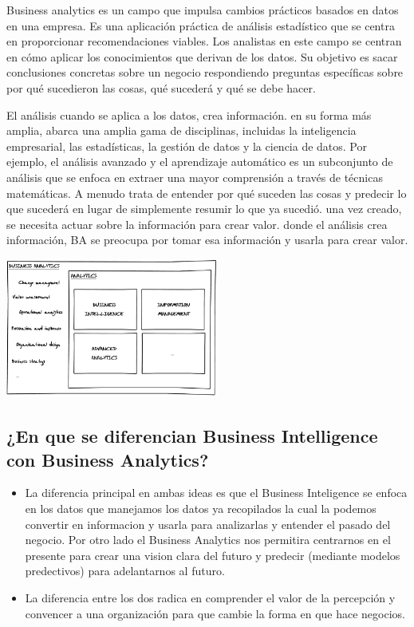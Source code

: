 \documentclass[twoside,twocolumn]{article}
\begin{document}
Business analytics es un campo que impulsa cambios prácticos basados en datos en una empresa. Es una aplicación práctica de análisis estadístico que se centra en proporcionar recomendaciones viables. Los analistas en este campo se centran en cómo aplicar los conocimientos que derivan de los datos. Su objetivo es sacar conclusiones concretas sobre un negocio respondiendo preguntas específicas sobre por qué sucedieron las cosas, qué sucederá y qué se debe hacer.
 
El análisis cuando se aplica a los datos, crea información. en su forma más amplia, abarca una amplia gama de disciplinas, incluidas la inteligencia empresarial, las estadísticas, la gestión de datos y la ciencia de datos. Por ejemplo, el análisis avanzado y el aprendizaje automático es un subconjunto de análisis que se enfoca en extraer una mayor comprensión a través de técnicas matemáticas. A menudo trata de entender por qué suceden las cosas y predecir lo que sucederá en lugar de simplemente resumir lo que ya sucedió. una vez creado, se necesita actuar sobre la información para crear valor. donde el análisis crea información, BA se preocupa por tomar esa información y usarla para crear valor.

\begin{center}
	\includegraphics[width=7cm]{./Imagenes/ba} 
\end{center}

\subsection{¿En que se diferencian Business Intelligence con Business Analytics?}
\begin{itemize}	
	\item La diferencia principal en ambas ideas es que el Business Inteligence se enfoca en los datos que manejamos los datos ya recopilados la cual la podemos convertir en informacion y usarla para analizarlas y entender el pasado del negocio. Por otro lado el Business Analytics nos permitira centrarnos en el presente para crear una vision clara del futuro y predecir (mediante modelos predectivos) para adelantarnos al futuro.
	\item La  diferencia entre los dos radica en comprender el valor de la percepción y convencer a una organización para que cambie la forma en que hace negocios.
\end{itemize} 
\end{document}
